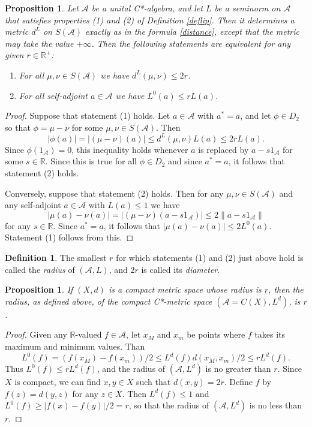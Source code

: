 \documentclass{amsart}[14pt]
\newtheorem{proposition}[theorem]{Proposition}
\theoremstyle{definition}
\newtheorem{definition}[theorem]{Definition}
\theoremstyle{remark}
\newcommand{\cA}{{\mathcal A}}
\newcommand{\bR}{{\mathbb R}}
\newcommand{\<}{\langle}
\renewcommand{\>}{\rangle}
\numberwithin{equation}{section}
\begin{document}
{\begin{proposition}
\label{diamet}
Let $\cA$ be a unital C*-algebra, and let $L$ be
a seminorm on $\cA$ that satisfies properties
(1) and (2) of Definition \ref{deflip}. Then it determines a metric $d^L$
on $S(\cA)$ exactly as in the formula \ref{distance}, except 
that the metric may take the value $+\infty$. Then the following
statements are equivalent for any given $ r \in \bR^+$:
\begin{enumerate}
\item  For all $\mu, \nu \in S(\cA)$ we have $d^L(\mu, \nu) \leq 2r$.
\item  For all self-adjoint $a \in \cA$ we have $L^0(a) \leq rL(a)$.
\end{enumerate}
\end{proposition}

\begin{proof}
Suppose that statement (1) holds. Let $a \in \cA$ with $a^* = a$, 
and let $\phi \in D_2$
so that $\phi = \mu - \nu$ for some $\mu, \nu \in S(\cA)$. Then
\[
|\phi(a)| = |(\mu - \nu)(a)| \leq d^L(\mu, \nu) L(a) \leq 2rL(a)  .
\]
Since 
$\phi(1_\cA) = 0$, this inequality holds whenever $a$ is replaced
by $a - s1_\cA$ for some $s \in \bR$. Since
this is true for all $\phi \in D_2$ and since $a^* = a$, it follows that 
statement (2) holds.

\noindent
Conversely, suppose that statement (2) holds. 
Then for any $\mu, \nu \in S(\cA)$ and any self-adjoint
$a\in \cA$ with $L(a) \leq 1$ we have
\[
|\mu(a) - \nu(a)| = |(\mu - \nu)(a - s1_\cA)| \leq 2\|a - s1_\cA\|
\]
for any $s \in \bR$. Since $a^* = a$, it follows that $|\mu(a) - \nu(a)| \leq 2L^0(a)$.
Statement (1) follows from this.
\end{proof}

\begin{definition}
\label{raddef}
The smallest $r$ for which statements (1) and (2) 
just above hold is
called the \emph{radius} of $(\cA, L)$, and $2r$ is
called its \emph{diameter}.
\end{definition}

\begin{proposition}
\label{ordrad}
If $(X, d)$ is a compact metric space whose radius
is $r$, then the radius, as
defined above, of the compact C*-metric
space $(\cA = C(X), L^d)$, is $r$.
\end{proposition}

\begin{proof}
Given any $\bR$-valued $f \in \cA$, let $x_M$ and $x_m$ be
points where $f$ takes its maximum and minimum values. Than
\[
L^0(f) = (f(x_M) - f(x_m))/2  \leq L^d(f) d(x_M, x_m)/2  \leq rL^d(f)  .
\]
Thus $L^0(f) \leq rL^d(f)$, and the radius of $(\cA, L^d)$ is
no greater than $r$. Since $X$ is compact, we can find
$x,y \in X$ such that $d(x,y) = 2r$. Define $f$ by
$f(z) = d(y, z)$ for any $z \in X$. Then $L^d(f) \leq 1$
and $L^0(f) \geq |f(x) - f(y)|/2 = r$, so that the radius of 
$(\cA, L^d)$ is no less than $r$.
\end{proof}
 
}
\end{document}
